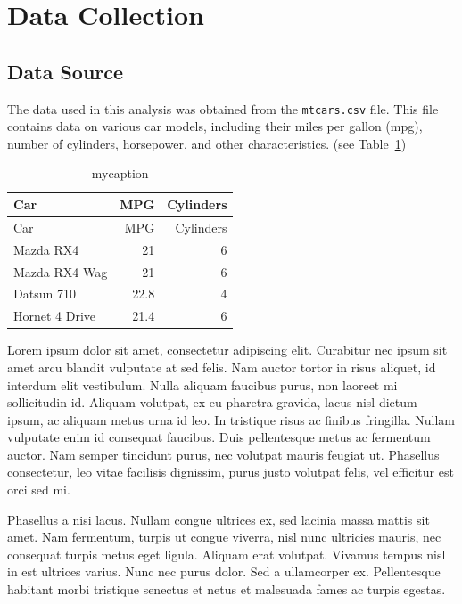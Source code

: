 \documentclass[
  letterpaper,
  DIV=11,
  numbers=noendperiod]{scrreprt}
\begin{document}
\hypertarget{data-collection}{%
\section{Data Collection}\label{data-collection}}

\hypertarget{data-source}{%
\subsection{Data Source}\label{data-source}}

The data used in this analysis was obtained from the \texttt{mtcars.csv}
file. This file contains data on various car models, including their
miles per gallon (mpg), number of cylinders, horsepower, and other
characteristics. (see Table~\ref{tbl-mytable3})

\hypertarget{tbl-mytable3}{}
\begin{longtable}[]{@{}lrr@{}}
\caption{\label{tbl-mytable3}mycaption}\tabularnewline
\toprule\noalign{}
Car & MPG & Cylinders \\
\midrule\noalign{}
\endfirsthead
\toprule\noalign{}
Car & MPG & Cylinders \\
\midrule\noalign{}
\endhead
\bottomrule\noalign{}
\endlastfoot
Mazda RX4 & 21 & 6 \\
Mazda RX4 Wag & 21 & 6 \\
Datsun 710 & 22.8 & 4 \\
Hornet 4 Drive & 21.4 & 6 \\
\end{longtable}

Lorem ipsum dolor sit amet, consectetur adipiscing elit. Curabitur nec
ipsum sit amet arcu blandit vulputate at sed felis. Nam auctor tortor in
risus aliquet, id interdum elit vestibulum. Nulla aliquam faucibus
purus, non laoreet mi sollicitudin id. Aliquam volutpat, ex eu pharetra
gravida, lacus nisl dictum ipsum, ac aliquam metus urna id leo. In
tristique risus ac finibus fringilla. Nullam vulputate enim id consequat
faucibus. Duis pellentesque metus ac fermentum auctor. Nam semper
tincidunt purus, nec volutpat mauris feugiat ut. Phasellus consectetur,
leo vitae facilisis dignissim, purus justo volutpat felis, vel efficitur
est orci sed mi.

Phasellus a nisi lacus. Nullam congue ultrices ex, sed lacinia massa
mattis sit amet. Nam fermentum, turpis ut congue viverra, nisl nunc
ultricies mauris, nec consequat turpis metus eget ligula. Aliquam erat
volutpat. Vivamus tempus nisl in est ultrices varius. Nunc nec purus
dolor. Sed a ullamcorper ex. Pellentesque habitant morbi tristique
senectus et netus et malesuada fames ac turpis egestas.
\end{document}
